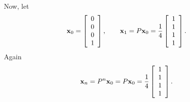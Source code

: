Now, let
$$
{\bf x}_0=\left[\begin{array}{c}0\\0\\0\\1\end{array}\right],\qquad
{\bf x}_1=P{\bf x}_0=\frac{1}{4}\left[\begin{array}{c}1\\1\\1\\1\end{array}\right].
$$
Again
$$
{\bf x}_n = P^n{\bf x}_0=P{\bf x}_0=
\frac{1}{4}\left[\begin{array}{c}1\\1\\1\\1\end{array}\right].
$$

